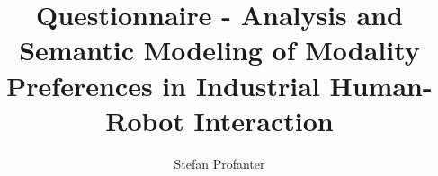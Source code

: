 \documentclass[	pdftex, 
a4paper,
12pt, DIV11, BCOR5mm,
parskip,								
numbers=noenddot,
final
]{scrartcl}
\author{Stefan Profanter}
\title{Questionnaire - Analysis and Semantic Modeling of Modality Preferences in Industrial Human-Robot Interaction}
\begin{document}
	

\newenvironment{question}[2]{
		\begin{minipage}[t]{7mm}{\bf#1.}\end{minipage} \begin{minipage}[t]{\textwidth-7mm}{\bf #2}\nopagebreak[4]\end{minipage}
		\begin{adjustwidth}{7mm}{0cm}
}{
		\end{adjustwidth}
}
\newcommand{\radio}[1]{\makebox[0.5cm][l]{$\bigcirc$} #1}
\newcommand{\radion}[1]{\radio{#1}\\}

\newcommand*{\textdoubletriangle}{%
  \resizebox{!}{\heightof{X}}{%
    \vbox{%
      \hbox{$\blacktriangle$}%
      \nointerlineskip
      \kern.75ex
      \hbox{$\blacktriangledown$}%
    }%
  }%
}

\newcommand\bigblacktriangleupdown{\vcenter{\hbox{${\textstyle\blacktriangle}\atop{\textstyle\blacktriangledown}$}}}
\newcommand{\sort}[1]{\makebox[0.2cm][l]{\textdoubletriangle} #1\\}
\newcommand{\specialcell}[2][t]{%
  \begin{tabular}[#1]{@{}c@{}}#2\end{tabular}}
\newcommand{\specialcelll}[2][t]{%
  \begin{tabular}[#1]{@{}l@{}}#2\end{tabular}}
\newcommand{\specialcells}[2][t]{%
  \begin{tabular}[#1]{@{}l@{}}#2\end{tabular}}
\end{document}
